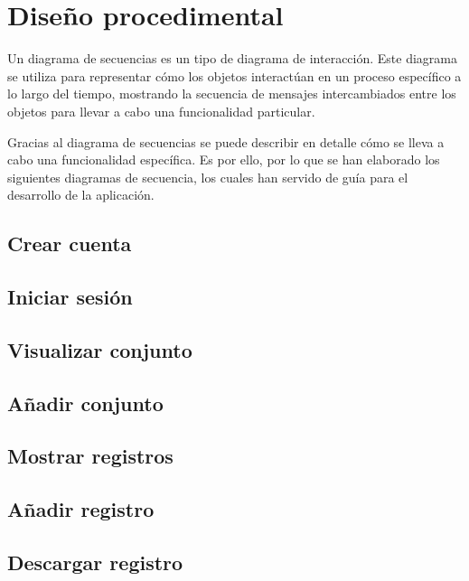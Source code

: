\section{Diseño procedimental}

Un diagrama de secuencias es un tipo de diagrama de interacción. Este diagrama se utiliza para representar cómo los objetos interactúan en un proceso específico a lo largo del tiempo, mostrando la secuencia de mensajes intercambiados entre los objetos para llevar a cabo una funcionalidad particular. \cite{Booch1998}

Gracias al diagrama de secuencias se puede describir en detalle cómo se lleva a cabo una funcionalidad específica. Es por ello, por lo que se han elaborado los siguientes diagramas de secuencia, los cuales han servido de guía para el desarrollo de la aplicación.

\subsection{Crear cuenta}

\subsection{Iniciar sesión}
\clearpage
\subsection{Visualizar conjunto}
\clearpage
\subsection{Añadir conjunto}
\clearpage
\subsection{Mostrar registros}
\clearpage
\subsection{Añadir registro}
\clearpage
\subsection{Descargar registro}
\clearpage
